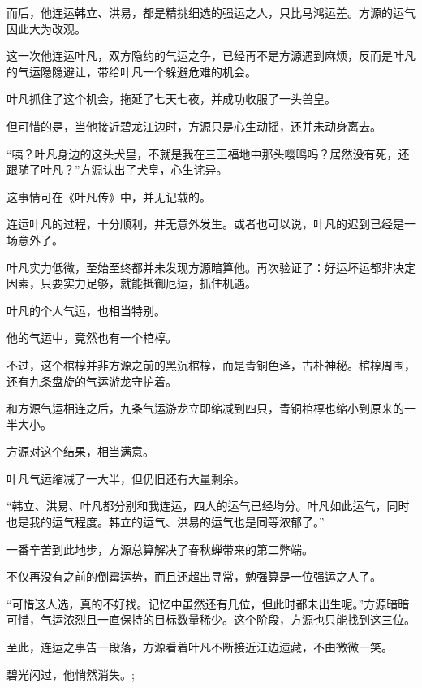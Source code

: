 \begin{this_body}
而后，他连运韩立、洪易，都是精挑细选的强运之人，只比马鸿运差。方源的运气因此大为改观。

这一次他连运叶凡，双方隐约的气运之争，已经再不是方源遇到麻烦，反而是叶凡的气运隐隐避让，带给叶凡一个躲避危难的机会。

叶凡抓住了这个机会，拖延了七天七夜，并成功收服了一头兽皇。

但可惜的是，当他接近碧龙江边时，方源只是心生动摇，还并未动身离去。

“咦？叶凡身边的这头犬皇，不就是我在三王福地中那头嘤鸣吗？居然没有死，还跟随了叶凡？”方源认出了犬皇，心生诧异。

这事情可在《叶凡传》中，并无记载的。

连运叶凡的过程，十分顺利，并无意外发生。或者也可以说，叶凡的迟到已经是一场意外了。

叶凡实力低微，至始至终都并未发现方源暗算他。再次验证了：好运坏运都非决定因素，只要实力足够，就能抵御厄运，抓住机遇。

叶凡的个人气运，也相当特别。

他的气运中，竟然也有一个棺椁。

不过，这个棺椁并非方源之前的黑沉棺椁，而是青铜色泽，古朴神秘。棺椁周围，还有九条盘旋的气运游龙守护着。

和方源气运相连之后，九条气运游龙立即缩减到四只，青铜棺椁也缩小到原来的一半大小。

方源对这个结果，相当满意。

叶凡气运缩减了一大半，但仍旧还有大量剩余。

“韩立、洪易、叶凡都分别和我连运，四人的运气已经均分。叶凡如此运气，同时也是我的运气程度。韩立的运气、洪易的运气也是同等浓郁了。”

一番辛苦到此地步，方源总算解决了春秋蝉带来的第二弊端。

不仅再没有之前的倒霉运势，而且还超出寻常，勉强算是一位强运之人了。

“可惜这人选，真的不好找。记忆中虽然还有几位，但此时都未出生呢。”方源暗暗可惜，气运浓烈且一直保持的目标数量稀少。这个阶段，方源也只能找到这三位。

至此，连运之事告一段落，方源看着叶凡不断接近江边遗藏，不由微微一笑。

碧光闪过，他悄然消失。;

\end{this_body}

